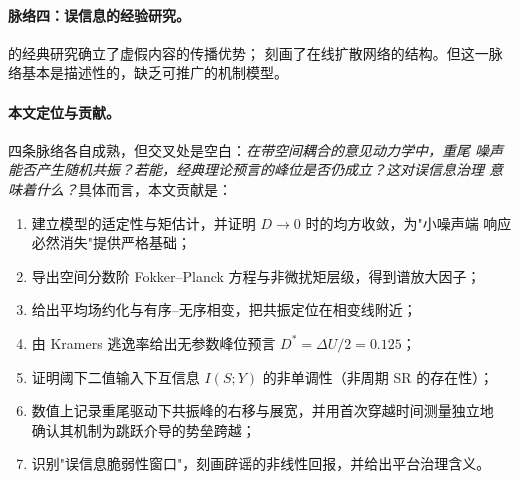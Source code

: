 \paragraph{脉络四：误信息的经验研究。}
\citet{vosoughi2018} 的经典研究确立了虚假内容的传播优势；\citet{goel2012}
刻画了在线扩散网络的结构。但这一脉络基本是描述性的，缺乏可推广的机制模型。

\paragraph{本文定位与贡献。}
四条脉络各自成熟，但交叉处是空白：\emph{在带空间耦合的意见动力学中，重尾
噪声能否产生随机共振？若能，经典理论预言的峰位是否仍成立？这对误信息治理
意味着什么？}具体而言，本文贡献是：
\begin{enumerate}[leftmargin=2em,itemsep=2pt]
  \item 建立模型的适定性与矩估计，并证明 $D\to0$ 时的均方收敛，为"小噪声端
        响应必然消失"提供严格基础；
  \item 导出空间分数阶 Fokker--Planck 方程与非微扰矩层级，得到谱放大因子；
  \item 给出平均场约化与有序--无序相变，把共振定位在相变线附近；
  \item 由 Kramers 逃逸率给出无参数峰位预言 $D^{*}=\Delta U/2=0.125$；
  \item 证明阈下二值输入下互信息 $I(S;Y)$ 的非单调性（非周期 SR 的存在性）；
  \item 数值上记录重尾驱动下共振峰的右移与展宽，并用首次穿越时间测量独立地
        确认其机制为跳跃介导的势垒跨越；
  \item 识别"误信息脆弱性窗口"，刻画辟谣的非线性回报，并给出平台治理含义。
\end{enumerate}

